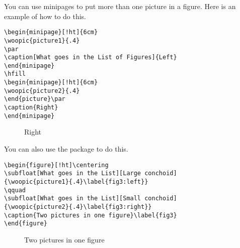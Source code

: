 You can use minipages to put more than one picture in a figure. Here is an example of how to do this.
\begin{singlespace}\small
\begin{verbatim}
\begin{minipage}[!ht]{6cm}
\woopic{picture1}{.4}
\par
\caption[What goes in the List of Figures]{Left}
\end{minipage}
\hfill
\begin{minipage}[!ht]{6cm}
\woopic{picture2}{.4}
\end{picture}\par
\caption{Right}
\end{minipage}
\end{verbatim}
\end{singlespace}
\begin{figure}[!ht]
\begin{minipage}[!ht]{6cm}
\par
\caption[What goes in the List of Figures]{Left}
\end{minipage}
\hfill
\begin{minipage}[!ht]{6cm}
\par
\caption{Right}
\end{minipage}
\end{figure}

You can also use the  package to do this. %

\begin{singlespace}\small
\begin{verbatim}
\begin{figure}[!ht]\centering
\subfloat[What goes in the List][Large conchoid]
{\woopic{picture1}{.4}\label{fig3:left}}
\qquad
\subfloat[What goes in the List][Small conchoid]
{\woopic{picture2}{.4}\label{fig3:right}}
\caption{Two pictures in one figure}\label{fig3}
\end{figure}
\end{verbatim}
\end{singlespace}
\begin{figure}[!ht]\centering
{}
\qquad
{}
\caption{Two pictures in one figure}\label{fig3}
\end{figure}

